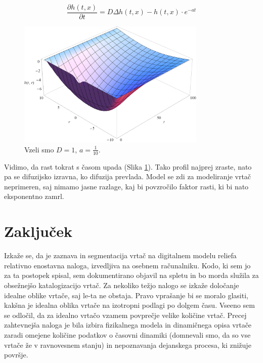 \documentclass[a4paper, twoside, 12pt]{book}
\begin{document}
    \begin{equation}
      \frac{ \partial h(t,x) }{ \partial t} = D \Delta h(t,x) - h(t,x) \cdot e^{-a t}
      \label{difuzija-gompertzova-rast}
    \end{equation}
    \begin{figure}[h]
      \begin{center}
        \includegraphics[width=9cm]{slike/difuzija-gompertzova-rast2}
      \end{center}
      \caption{Vzeli smo $D=1$, $a=\frac{1}{10}$.}
      \label{fig:difuzija-gompertzova-rast}
    \end{figure}

    Vidimo, da rast tokrat s časom upada (Slika \ref{fig:difuzija-gompertzova-rast}). Tako profil najprej zraste, nato pa se difuzijsko izravna, ko difuzija prevlada.
    Model se zdi za modeliranje vrtač neprimeren, saj nimamo jasne razlage, kaj bi povzročilo faktor rasti, ki bi nato eksponentno zamrl.


    \chapter{Zaključek}

    Izkaže se, da je zaznava in segmentacija vrtač na digitalnem modelu reliefa relativno enostavna naloga, izvedljiva na osebnem računalniku. Kodo, ki sem jo za ta postopek spisal, sem dokumentirano objavil na spletu in bo morda služila za obsežnejšo katalogizacijo vrtač.
    Za nekoliko težjo nalogo se izkaže določanje idealne oblike vrtače, saj le-ta ne obstaja. Pravo vprašanje bi se moralo glasiti, kakšna je idealna oblika vrtače na izotropni podlagi po dolgem času. Vseeno sem se odločil, da za idealno vrtačo vzamem povprečje velike količine vrtač.
    Precej zahtevnejša naloga je bila izbira fizikalnega modela in dinamičnega opisa vrtače zaradi omejene količine podatkov o časovni dinamiki (domnevali smo, da so vse vrtače že v ravnovesnem stanju) in nepoznavanja dejanskega procesa, ki znižuje površje.
\end{document}
